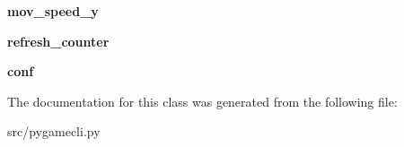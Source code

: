 \begin{DoxyCompactItemize}
\item 
\hypertarget{classsrc_1_1pygamecli_1_1_client_acef1a4ec933fe63a4432499cd06ddc53}{{\bfseries mov\-\_\-speed\-\_\-y}}\label{classsrc_1_1pygamecli_1_1_client_acef1a4ec933fe63a4432499cd06ddc53}

\item 
\hypertarget{classsrc_1_1pygamecli_1_1_client_a76d2ec80dd59e72aaba9babaf7dd857e}{{\bfseries refresh\-\_\-counter}}\label{classsrc_1_1pygamecli_1_1_client_a76d2ec80dd59e72aaba9babaf7dd857e}

\item 
\hypertarget{classsrc_1_1pygamecli_1_1_client_a210e805a54e4975af2f3608244768619}{{\bfseries conf}}\label{classsrc_1_1pygamecli_1_1_client_a210e805a54e4975af2f3608244768619}

\end{DoxyCompactItemize}


\-The documentation for this class was generated from the following file\-:\begin{DoxyCompactItemize}
\item 
src/pygamecli.\-py\end{DoxyCompactItemize}
